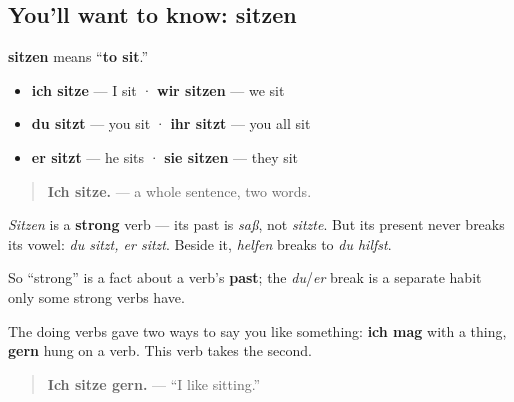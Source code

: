 \subsection*{You'll want to know: sitzen}
\textbf{sitzen} means \textquotedblleft{}\textbf{to sit}.\textquotedblright{}

\begin{itemize}
\raggedright
  \item \textbf{ich sitze} — I sit · \textbf{wir sitzen} — we sit
  \item \textbf{du sitzt} — you sit · \textbf{ihr sitzt} — you all sit
  \item \textbf{er sitzt} — he sits · \textbf{sie sitzen} — they sit
\end{itemize}

\begin{quote}
\textbf{Ich sitze.} — a whole sentence, two words.
\end{quote}

\begin{grammarlens}[title={Grammar Lens: strong does not mean it breaks}]
\emph{Sitzen} is a \textbf{strong} verb — its past is \emph{saß}, not \emph{sitzte}. But its present never breaks its vowel: \emph{du sitzt, er sitzt}. Beside it, \emph{helfen} breaks to \emph{du hilfst}.

So \textquotedblleft{}strong\textquotedblright{} is a fact about a verb's \textbf{past}; the \emph{du}/\emph{er} break is a separate habit only some strong verbs have.

The doing verbs gave two ways to say you like something: \textbf{ich mag} with a thing, \textbf{gern} hung on a verb. This verb takes the second.

\begin{quote}
\textbf{Ich sitze gern.} — \textquotedblleft{}I like sitting.\textquotedblright{}
\end{quote}
\end{grammarlens}

